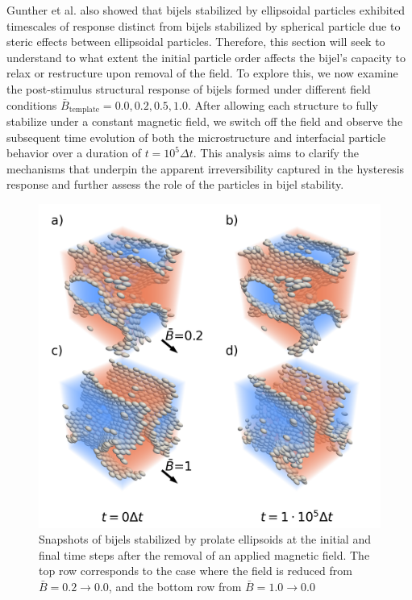 Gunther et al. also showed that bijels stabilized by ellipsoidal particles exhibited timescales 
of response distinct from bijels stabilized by spherical particle due to steric effects between ellipsoidal particles.
Therefore, this section will seek to understand to what extent the initial particle order affects the 
bijel's capacity to relax or restructure upon removal of the field. To explore this, 
we now examine the post-stimulus structural response of bijels formed under different field conditions 
\(\bar{B}_{\text{template}} = 0.0, 0.2, 0.5, 1.0\). After allowing each structure to fully stabilize under a 
constant magnetic field, we switch off the field and observe the subsequent time evolution of both the 
microstructure and interfacial particle behavior over a duration of \(t = 10^5 \Delta t\). This analysis aims to 
clarify the mechanisms that underpin the apparent irreversibility captured in the hysteresis response and further 
assess the role of the particles in bijel stability.

\begin{figure} 
\centering 
\includegraphics[scale=0.45]{../figures/results/paper2/microstructure_viz-field_down.png} 
\caption{Snapshots of bijels stabilized by prolate ellipsoids at 
         the initial and final time steps after the removal of an applied magnetic field. The top row corresponds to the case where 
         the field is reduced from \(\bar{B} = 0.2 \rightarrow 0.0\), and the bottom row from \(\bar{B} = 1.0 \rightarrow 0.0\)}
\label{fig:microstructure_viz-field_down}
\end{figure}

